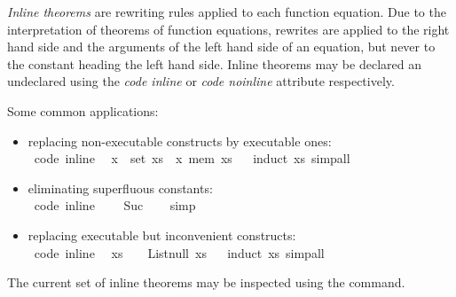 \begin{isabellebody}
\begin{isamarkuptext}
  \emph{Inline theorems} are rewriting rules applied to each
  function equation.  Due to the interpretation of theorems
  of function equations, rewrites are applied to the right
  hand side and the arguments of the left hand side of an
  equation, but never to the constant heading the left hand side.
  Inline theorems may be declared an undeclared using the
  \emph{code inline} or \emph{code noinline} attribute respectively.

  Some common applications:%
\end{isamarkuptext}%
\isamarkuptrue%
%
\begin{itemize}
     \item replacing non-executable constructs by executable ones: \\
\isamarkupfalse%
\ {\isacharbrackleft}code\ inline{\isacharbrackright}{\isacharcolon}\isanewline
\ \ {\isachardoublequoteopen}x\ {\isasymin}\ set\ xs\ {\isasymlongleftrightarrow}\ x\ mem\ xs{\isachardoublequoteclose}%
\isadelimproof
\ %
\endisadelimproof
%
\isatagproof
{}\isamarkupfalse%
\ {\isacharparenleft}induct\ xs{\isacharparenright}\ simp{\isacharunderscore}all%
\endisatagproof
{\isafoldproof}%
%
\isadelimproof
%
\endisadelimproof
%
\item eliminating superfluous constants: \\
\isamarkupfalse%
\ {\isacharbrackleft}code\ inline{\isacharbrackright}{\isacharcolon}\isanewline
\ \ {\isachardoublequoteopen}{}\ {\isacharequal}\ Suc\ {}{\isachardoublequoteclose}%
\isadelimproof
\ %
\endisadelimproof
%
\isatagproof
{}\isamarkupfalse%
\ simp%
\endisatagproof
{\isafoldproof}%
%
\isadelimproof
%
\endisadelimproof
%
\item replacing executable but inconvenient constructs: \\
\isamarkupfalse%
\ {\isacharbrackleft}code\ inline{\isacharbrackright}{\isacharcolon}\isanewline
\ \ {\isachardoublequoteopen}xs\ {\isacharequal}\ {\isacharbrackleft}{\isacharbrackright}\ {\isasymlongleftrightarrow}\ List{\isachardot}null\ xs{\isachardoublequoteclose}%
\isadelimproof
\ %
\endisadelimproof
%
\isatagproof
{}\isamarkupfalse%
\ {\isacharparenleft}induct\ xs{\isacharparenright}\ simp{\isacharunderscore}all%
\endisatagproof
{\isafoldproof}%
%
\isadelimproof
%
\endisadelimproof
%
\end{itemize}
%
\begin{isamarkuptext}%
The current set of inline theorems may be inspected using
  the \isasymPRINTCODETHMS command.


\end{isamarkuptext}
\end{isabellebody}
